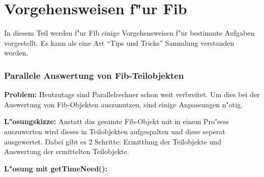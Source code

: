 %
%
%
%

\newpage
\part{Vorgehensweisen f"ur Fib}
\label{partProcedures}

In diesem Teil werden f"ur Fib einige Vorgehensweisen f"ur bestimmte Aufgaben vorgestellt. Es kann als eine Art ``Tips und Tricks'' Sammlung verstanden werden.


\section{Parallele Auswertung von Fib-Teilobjekten}

\bigskip\noindent
\textbf{Problem:}
Heutzutage sind Parallelrechner schon weit verbreitet. Um dies bei der Auswertung von Fib-Objekten auszunutzen, sind einige Anpassungen n"otig.

\bigskip\noindent
\textbf{L"osungskizze:} 
Anstatt das gesamte Fib-Objekt mit in einem Pro"sess auszuwerten wird dieses in Teilobjekten aufgespalten und diese seperat ausgewertet.
Dabei gibt es 2 Schritte: Ermittlung der Teilobjekte und Auswertung der ermittelten Teilobjekte.

\bigskip\noindent
\textbf{L"osung mit getTimeNeed():}


